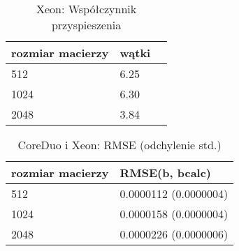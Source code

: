 \documentclass[11pt,a4paper]{article}
\begin{document}
\begin{table}[h!]
\begin{center}
\begin{tabular}{lll}
\toprule
rozmiar macierzy &  wątki \\
\midrule
512 & 6.25 \\
1024 & 6.30 \\
2048 & 3.84 \\
\bottomrule
\end{tabular}
\caption{Xeon: Współczynnik przyspieszenia}
\end{center}
\end{table}

\begin{table}[h!]
\begin{center}
\begin{tabular}{ll}
\toprule
rozmiar macierzy & RMSE(b, bcalc) \\
\midrule
512  & 0.0000112 (0.0000004)  \\
1024 & 0.0000158 (0.0000004)  \\
2048 & 0.0000226 (0.0000006)  \\
\bottomrule
\end{tabular}
\caption{CoreDuo i Xeon: RMSE (odchylenie std.)}
\end{center}
\end{table}
\end{document}
